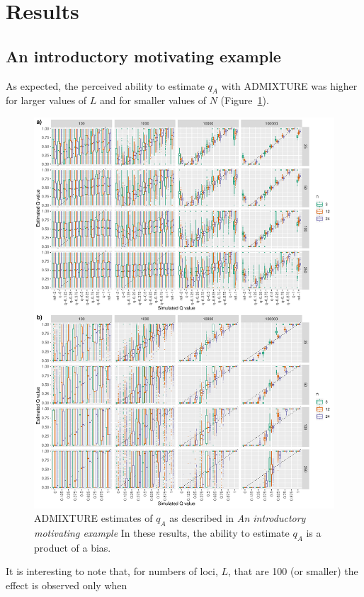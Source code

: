 \section*{Results}

\subsection*{An introductory motivating example}

As expected, the perceived ability to estimate $q_A$ with ADMIXTURE was higher
for larger values of $L$ and for smaller values of $N$ (Figure~\ref{fig:bias-sims}).  
\begin{figure}
\includegraphics[width=\textwidth]{figures/bias-sims-unsup-and-sup.pdf}
\caption{ADMIXTURE estimates of $q_A$ as described in
{\em An introductory motivating example} In these results, the ability to estimate $q_A$
is a product of a bias.
}
\label{fig:bias-sims}
\end{figure}
It is interesting to note
that, for numbers of loci,  $L$, that are 100 (or smaller) the effect is observed only when
